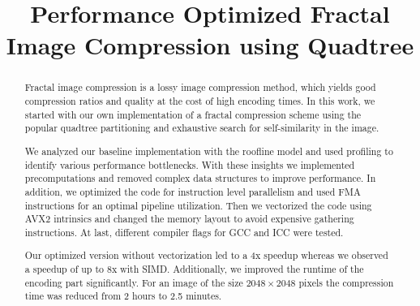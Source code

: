 \documentclass[letterpaper]{article}
\title{Performance Optimized Fractal Image Compression using Quadtree}
\begin{document}
%
\maketitle
%
%

\setlength{\abovedisplayskip}{1ex}
\setlength{\belowdisplayskip}{1ex}

\begin{abstract}
  Fractal image compression is a lossy image compression method, which yields
  good compression ratios and quality at the cost of high encoding times. In
  this work, we started with our own implementation of a fractal compression
  scheme using the popular quadtree partitioning and exhaustive search for
  self-similarity in the image.

  We analyzed our baseline implementation with the roofline model and used
  profiling to identify various performance bottlenecks. With these insights we
  implemented precomputations and removed complex data structures to improve
  performance. In addition, we optimized the code for instruction level
  parallelism and used FMA instructions for an optimal pipeline utilization.
  Then we vectorized the code using AVX2 intrinsics and changed the memory
  layout to avoid expensive gathering instructions. At last, different compiler
  flags for GCC and ICC were tested.

  Our optimized version without vectorization led to a 4x speedup whereas we
  observed a speedup of up to 8x with SIMD. Additionally, we improved the
  runtime of the encoding part significantly. For an image of the size
  $2048 \times 2048$ pixels the compression time was reduced from 2 hours to 2.5
  minutes.

\end{abstract}










\end{document}
